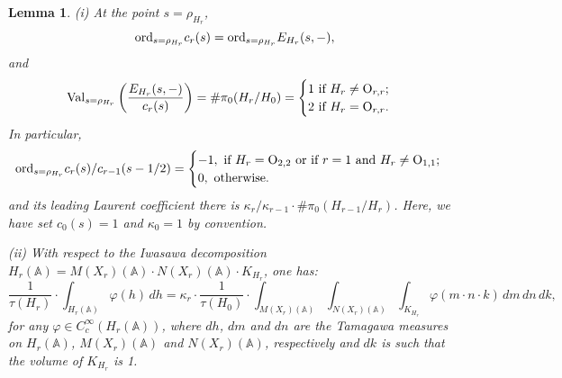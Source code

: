\documentclass[10pt]{amsart}
\theoremstyle{plain}
\newtheorem{Lem}[equation]{Lemma}
\numberwithin{equation}{section}
\begin{document}
\begin{Lem} \label{L:kappa}
 (i) At the point $s = \rho_{H_r}$, 
 \[  {\rm ord}_{s = \rho_{H_r}} c_r(s)  = {\rm ord}_{s= \rho_{H_r}}E_{H_r}(s,-), \]
 and
 \[ {\rm Val}_{s = \rho_{H_r}} \left(  \frac{E_{H_r}(s,-)}{c_r(s)} \right) =
 \# \pi_0(H_r/H_0) = \begin{cases}
 1 \text{  if $H_r \ne {\operatorname{O}}_{r,r}$;} \\
 2 \text{  if $H_r = {\operatorname{O}}_{r,r}$.}\end{cases} \]
 In particular, 
 \[  {\rm ord}_{s = \rho_{H_r}} c_r(s)/c_{r-1}(s-1/2)
 = \begin{cases}
 -1,  \text{  if $H_r= {\operatorname{O}}_{2,2}$ or if $r=1$ and $H_r \ne {\operatorname{O}}_{1,1}$;} \\
 0, \text{  otherwise.}  \end{cases} \]
and its leading Laurent coefficient  there is $\kappa_r/
 \kappa_{r-1} \cdot \# \pi_0(H_{r-1}/H_r)$. Here, we have set $c_0(s) =1$ and $\kappa_0 =1$ by convention.
 
  \vskip 5pt
 
 (ii)  With respect to the Iwasawa decomposition $H_r({\mathbb{A}}) =  M(X_r)({\mathbb{A}})
 \cdot N(X_r)({\mathbb{A}}) \cdot  K_{H_r}$, one has:
\[ \frac{1}{\tau(H_r)} \cdot  \int_{H_r({\mathbb{A}})} \varphi(h) \,  dh  = \kappa_r  \cdot
\frac{1}{\tau(H_0)} \cdot \int_{M(X_r)({\mathbb{A}})}  \int_{N(X_r)({\mathbb{A}})}  \int_{K_{H_r}}
\varphi(m \cdot n \cdot k) \,   dm \,  dn   \,  dk,\] 
for any $\varphi \in C^{\infty}_c(H_r({\mathbb{A}}))$, where $dh$, $dm$ and $dn$
are the Tamagawa measures on $H_r({\mathbb{A}})$, $M(X_r)({\mathbb{A}})$ and $N(X_r)({\mathbb{A}})$,
respectively and $dk$ is such that the volume of $K_{H_r}$ is 1.
 \end{Lem}
\vskip 5pt
\end{document}
